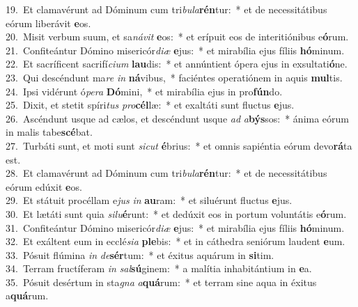 {19.~}Et clamavérunt ad Dóminum cum tri\textit{bu}\textit{la}\textbf{rén}tur:~* et de necessitátibus eórum liberávit \textbf{e}os.\\
{20.~}Misit verbum suum, et sa\textit{ná}\textit{vit} \textbf{e}os:~* et erípuit eos de interitiónibus e\textbf{ó}rum.\\
{21.~}Confiteántur Dómino misericór\textit{di}\textit{æ} \textbf{e}jus:~* et mirabília ejus fíliis \textbf{hó}minum.\\
{22.~}Et sacríficent sacrifí\textit{ci}\textit{um} \textbf{lau}dis:~* et annúntient ópera ejus in exsultati\textbf{ó}ne.\\
{23.~}Qui descéndunt ma\textit{re} \textit{in} \textbf{ná}vibus,~* faciéntes operatiónem in aquis \textbf{mul}tis.\\
{24.~}Ipsi vidérunt ó\textit{pe}\textit{ra} \textbf{Dó}mini,~* et mirabília ejus in pro\textbf{fún}do.\\
{25.~}Dixit, et stetit spíri\textit{tus} \textit{pro}\textbf{cél}læ:~* et exaltáti sunt fluctus \textbf{e}jus.\\
{26.~}Ascéndunt usque ad cælos, et descéndunt usque \textit{ad} \textit{a}\textbf{býs}sos:~* ánima eórum in malis tabe\textbf{scé}bat.\\
{27.~}Turbáti sunt, et moti sunt \textit{si}\textit{cut} \textbf{é}brius:~* et omnis sapiéntia eórum devo\textbf{rá}ta est.\\
{28.~}Et clamavérunt ad Dóminum cum tri\textit{bu}\textit{la}\textbf{rén}tur:~* et de necessitátibus eórum edúxit \textbf{e}os.\\
{29.~}Et státuit procéllam e\textit{jus} \textit{in} \textbf{au}ram:~* et siluérunt fluctus \textbf{e}jus.\\
{30.~}Et lætáti sunt quia \textit{si}\textit{lu}\textbf{é}runt:~* et dedúxit eos in portum voluntátis e\textbf{ó}rum.\\
{31.~}Confiteántur Dómino misericór\textit{di}\textit{æ} \textbf{e}jus:~* et mirabília ejus fíliis \textbf{hó}minum.\\
{32.~}Et exáltent eum in ecclé\textit{si}\textit{a} \textbf{ple}bis:~* et in cáthedra seniórum laudent \textbf{e}um.\\
{33.~}Pósuit flúmina \textit{in} \textit{de}\textbf{sér}tum:~* et éxitus aquárum in \textbf{si}tim.\\
{34.~}Terram fructíferam \textit{in} \textit{sal}\textbf{sú}ginem:~* a malítia inhabitántium in \textbf{e}a.\\
{35.~}Pósuit desértum in sta\textit{gna} \textit{a}\textbf{quá}rum:~* et terram sine aqua in éxitus a\textbf{quá}rum.\\
